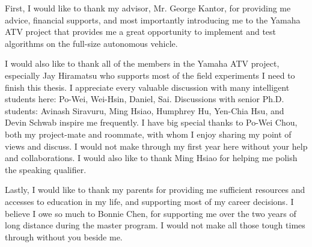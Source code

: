 \documentclass[hidelinks, 12pt]{cmuthesis}
\begin{document}
\begin{acknowledgments}

First, I would like to thank my advisor, Mr. George Kantor, for providing me advice, financial supports, and most importantly introducing me to the Yamaha ATV project that provides me a great opportunity to implement and test algorithms on the full-size autonomous vehicle.

I would also like to thank all of the members in the Yamaha ATV project, especially Jay Hiramatsu who supports most of the field experiments I need to finish this thesis. I appreciate every valuable discussion with many intelligent students here: Po-Wei, Wei-Hsin, Daniel, Sai. Discussions with senior Ph.D. students: Avinash Siravuru, Ming Hsiao, Humphrey Hu, Yen-Chia Hsu, and Devin Schwab inspire me frequently. 
I have big special thanks to Po-Wei Chou, both my project-mate and roommate, with whom I enjoy sharing my point of views and discuss. 
I would not make through my first year here without your help and collaborations.
I would also like to thank Ming Hsiao for helping me polish the speaking qualifier. 

Lastly, I would like to thank my parents for providing me sufficient resources and accesses to education in my life, and supporting most of my career decisions. I believe I owe so much to Bonnie Chen, for supporting me over the two years of long distance during the master program. I would not make all those tough times through without you beside me.
  
\end{acknowledgments}



\tableofcontents
\listoffigures
\listoftables

\mainmatter


%
%
%
%
%
\end{document}
